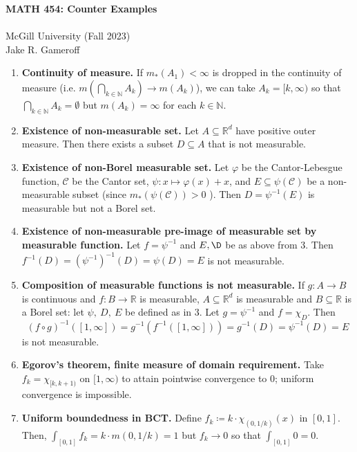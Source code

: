 
\usepackage{todonotes}

\thispagestyle{empty}
\begin{center}
	\textbf{\large MATH 454: Counter Examples} \\
    \\ \large McGill University (Fall 2023)
    \\ Jake R. Gameroff 
\end{center}
\begin{enumerate}
	\item \textbf{Continuity of measure.} If \( m_*(A_1)  < \infty\) is dropped in the continuity of measure (i.e. \( m(\bigcap_{k \in \mathbb{N} }^{} A_{k} ) \to m(A_{k}) \)), we can take \( A_{k} = [k, \infty) \) so that \( \bigcap_{k \in \mathbb{N} }^{} A_{k} = \emptyset  \) but \( m(A_{k} ) = \infty \) for each \( k \in \mathbb{N} \).
	\item \textbf{Existence of non-measurable set.} Let \( A \subseteq \mathbb{R}^{d}  \) have positive outer measure. Then there exists a subset \( D \subseteq A \) that is not measurable.
	\item \textbf{Existence of non-Borel measurable set.} Let \( \varphi  \) be the Cantor-Lebesgue function, \( \mathcal{C}  \) be the Cantor set, \( \psi : x \mapsto \varphi (x) + x\), and \( E \subseteq \psi (\mathcal{C} ) \) be a non-measurable subset (since \( m_*(\psi (\mathcal{C} )) > 0  \) ). Then \( D = \psi ^{-1} (E)  \) is measurable but not a Borel set.
	\item \textbf{Existence of non-measurable pre-image of measurable set by measurable function.} Let \( f = \psi ^{-1} \) and \( E, \D \) be as above from 3. Then \( f^{-1} (D) = (\psi ^{-1} )^{-1} (D) = \psi (D) = E    \) is not measurable.
	\item \textbf{Composition of measurable functions is not measurable.} If \( g : A \to B \) is continuous and \( f : B \to \mathbb{R} \) is measurable, \( A \subseteq \mathbb{R}^{d}  \) is measurable and \( B \subseteq \mathbb{R} \) is a Borel set: let \( \psi, \ D, \ E \) be defined as in 3. Let \( g = \psi ^{-1}  \) and \( f = \chi_{D} \). Then \[(f \circ g)^{-1} ([1, \infty]) = g ^{-1} (f ^{-1} ([1, \infty]) ) = g ^{-1} (D) = \psi ^{-1} (D) = E\] is not measurable.
	\item \textbf{Egorov's theorem, finite measure of domain requirement.} Take \( f_{k} = \chi_{[k, k+1)}   \) on \( [1, \infty) \) to attain pointwise convergence to 0; uniform convergence is impossible.
	\item \textbf{Uniform boundedness in BCT.} Define \( f_{k} \coloneqq k \cdot \chi_{(0, 1/k)}(x)  \) in \( [0,1] \). Then, \( \int_{[0,1]} f_{k} = k \cdot m(0, 1/k) = 1  \) but \( f_{k} \to 0 \) so that \( \int_{[0,1]} 0 = 0 \).

\end{enumerate}
